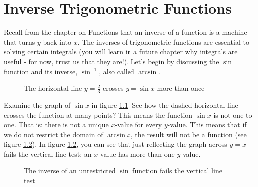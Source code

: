 \chapter{Inverse Trigonometric Functions}

Recall from the chapter on Functions that an inverse of a function is a machine that turns $y$ back into $x$. The inverses of trigonometric functions are essential to solving certain integrals (you will learn in a future chapter why integrals are useful - for now, trust us that they are!). Let's begin by discussing the $\sin$ function and its inverse, $\sin^{-1}$, also called $\arcsin$. 

\begin{figure}
\centering
	\caption{The horizontal line $y=\frac{2}{3}$ crosses $y = \sin{x}$ more than once}
	\label{fig:sinhline}
\end{figure}

Examine the graph of $\sin{x}$ in figure \ref{fig:sinhline}. See how the dashed horizontal line crosses the function at many points? This means the function $\sin{x}$ is not one-to-one. That is: there is not a unique $x$-value for every $y$-value. This means that if we do not restrict the domain of $\arcsin{x}$, the result will not be a function (see figure \ref{fig:arcsinvline}). In figure \ref{fig:arcsinvline}, you can see that just reflecting the graph across $y=x$ fails the vertical line test: an $x$ value has more than one $y$ value.

\begin{figure}
	\caption{The inverse of an unrestricted $\sin$ function fails the vertical line test}
	\label{fig:arcsinvline}
\end{figure} 

